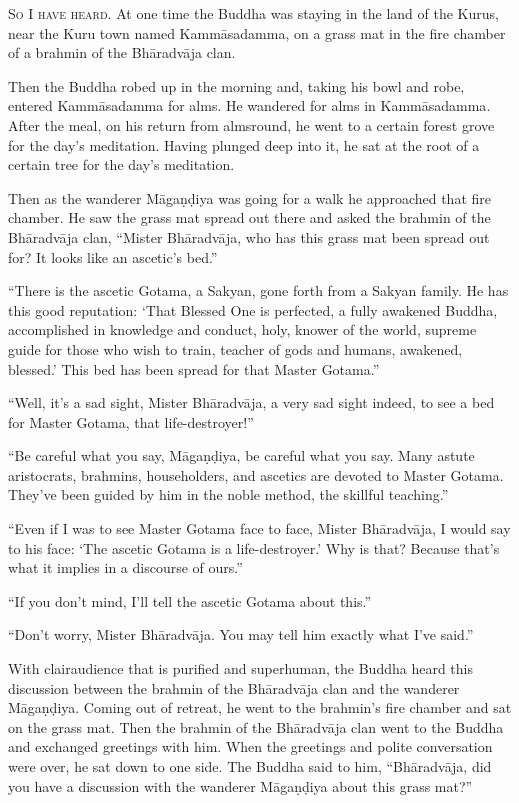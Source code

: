 \documentclass[12pt,openany]{book}%
\newcommand*{\scevam}[1]{\textsc{#1}}
\begin{document}
\scevam{So I have heard. }At one time the Buddha was staying in the land of the Kurus, near the Kuru town named \textsanskrit{Kammāsadamma}, on a grass mat in the fire chamber of a brahmin of the \textsanskrit{Bhāradvāja} clan. 

Then the Buddha robed up in the morning and, taking his bowl and robe, entered \textsanskrit{Kammāsadamma} for alms. He wandered for alms in \textsanskrit{Kammāsadamma}. After the meal, on his return from almsround, he went to a certain forest grove for the day’s meditation. Having plunged deep into it, he sat at the root of a certain tree for the day’s meditation. 

Then as the wanderer \textsanskrit{Māgaṇḍiya} was going for a walk he approached that fire chamber. He saw the grass mat spread out there and asked the brahmin of the \textsanskrit{Bhāradvāja} clan, “Mister \textsanskrit{Bhāradvāja}, who has this grass mat been spread out for? It looks like an ascetic’s bed.” 

“There is the ascetic Gotama, a Sakyan, gone forth from a Sakyan family. He has this good reputation: ‘That Blessed One is perfected, a fully awakened Buddha, accomplished in knowledge and conduct, holy, knower of the world, supreme guide for those who wish to train, teacher of gods and humans, awakened, blessed.’ This bed has been spread for that Master Gotama.” 

“Well, it’s a sad sight, Mister \textsanskrit{Bhāradvāja}, a very sad sight indeed, to see a bed for Master Gotama, that life-destroyer!” 

“Be careful what you say, \textsanskrit{Māgaṇḍiya}, be careful what you say. Many astute aristocrats, brahmins, householders, and ascetics are devoted to Master Gotama. They’ve been guided by him in the noble method, the skillful teaching.” 

“Even if I was to see Master Gotama face to face, Mister \textsanskrit{Bhāradvāja}, I would say to his face: ‘The ascetic Gotama is a life-destroyer.’ Why is that? Because that’s what it implies in a discourse of ours.” 

“If you don’t mind, I’ll tell the ascetic Gotama about this.” 

“Don’t worry, Mister \textsanskrit{Bhāradvāja}. You may tell him exactly what I’ve said.” 

With clairaudience that is purified and superhuman, the Buddha heard this discussion between the brahmin of the \textsanskrit{Bhāradvāja} clan and the wanderer \textsanskrit{Māgaṇḍiya}. Coming out of retreat, he went to the brahmin’s fire chamber and sat on the grass mat. Then the brahmin of the \textsanskrit{Bhāradvāja} clan went to the Buddha and exchanged greetings with him. When the greetings and polite conversation were over, he sat down to one side. The Buddha said to him, “\textsanskrit{Bhāradvāja}, did you have a discussion with the wanderer \textsanskrit{Māgaṇḍiya} about this grass mat?” 
\end{document}
